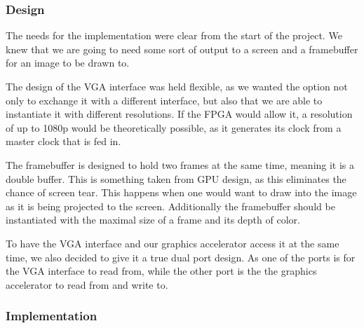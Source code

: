 \subsubsection*{Design}\label{subsubsec:des_buff}
The needs for the implementation were clear from the start of the project. We knew that we are going to need some sort of output to a screen and a framebuffer for an image to be drawn to.

The design of the VGA interface was held flexible, as we wanted the option not only to exchange it with a different interface, but also that we are able to instantiate it with different resolutions. If the FPGA would allow it, a resolution of up to 1080p would be theoretically possible, as it generates its clock from a master clock that is fed in.

The framebuffer is designed to hold two frames at the same time, meaning it is a double buffer. This is something taken from GPU design, as this eliminates the chance of screen tear. This happens when one would want to draw into the image as it is being projected to the screen. Additionally the framebuffer should be instantiated with the maximal size of a frame and its depth of color.

To have the VGA interface and our graphics accelerator access it at the same time, we also decided to give it a true dual port design. As one of the ports is for the VGA interface to read from, while the other port is the the graphics accelerator to read from and write to.


\subsubsection*{Implementation}

